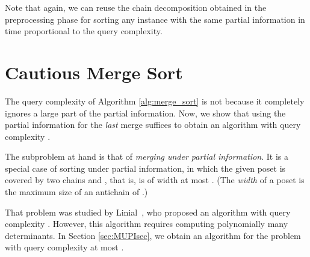 \documentclass{article} \usepackage{fullpage}
\begin{document}
Note that again, we can reuse the chain decomposition obtained in the preprocessing phase for sorting any instance with the same partial information in time proportional to the query complexity.

\section{Cautious Merge Sort}
\label{sec:cautious_merge}

The query complexity of Algorithm \ref{alg:merge_sort} is not  because it completely ignores a large part of the partial information. Now, we show that using the partial information for the {\sl last\/} merge suffices to obtain an algorithm with query complexity .

The subproblem at hand is that of {\sl merging under partial information\/}. It is a special case of sorting under partial information, in which the given poset  is covered by two chains  and , that is,  is of width at most . (The {\sl width\/} of a poset  is the maximum size of an antichain of .)

That problem was studied by Linial~\cite{L84}, who proposed an algorithm with query complexity . However, this algorithm requires computing polynomially many  determinants. In Section \ref{sec:MUPIsec}, we obtain an  algorithm for the problem with query complexity at most . 
\end{document}
